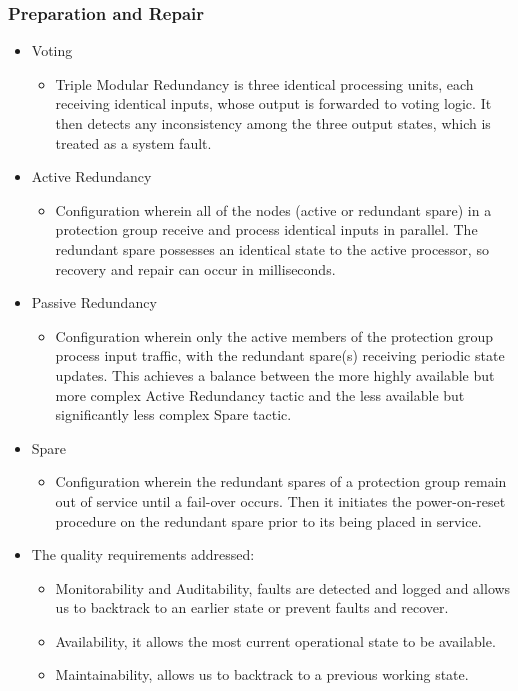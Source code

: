 \documentclass[12pt, oneside]{article}
\begin{document}
		\subsubsection{Preparation and Repair}
		\begin{itemize}
		
		\item Voting
		\begin{itemize}
		\item Triple Modular Redundancy is three identical processing units, each receiving identical inputs, whose output is forwarded to voting logic. It then detects any inconsistency among the three output states, which is treated as a system fault.
		\end{itemize}
		
		
		\item Active Redundancy
		\begin{itemize}
		\item Configuration wherein all of the nodes (active or redundant spare) in a protection group receive and process identical inputs in parallel. The redundant spare possesses an identical state to the active processor, so recovery and repair can occur in milliseconds.
		\end{itemize}
		
		\item Passive Redundancy
		\begin{itemize}
		\item Configuration wherein only the active members of the protection group process input traffic, with the redundant spare(s) receiving periodic state updates. This achieves a balance between the more highly available but more complex Active Redundancy tactic and the less available but significantly less complex Spare tactic.
		\end{itemize}
		
		\item Spare
		\begin{itemize}
		\item Configuration wherein the redundant spares of a protection group remain out of service until a fail-over occurs. Then it initiates the power-on-reset procedure on the redundant spare prior to its being placed in service.
		\end{itemize}
		
		\item The quality requirements addressed:
		\begin{itemize}
			\item Monitorability and Auditability, faults are detected and logged and allows us to backtrack to an earlier state or prevent faults and recover.
			\item Availability, it allows the most current operational state to be available.
			\item Maintainability, allows us to backtrack to a previous working state. 
		\end{itemize}
		

\end{itemize}
\end{document}
